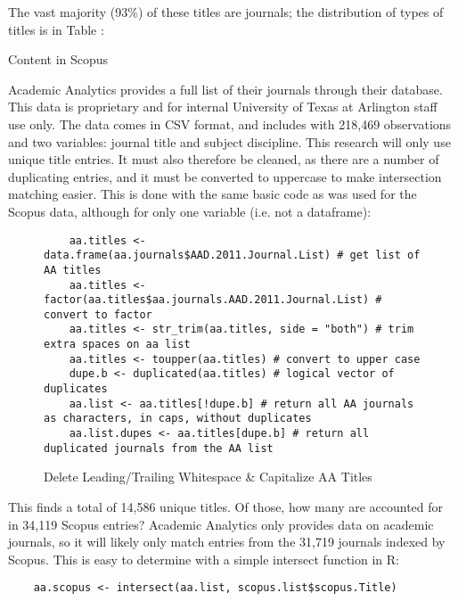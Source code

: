\documentclass{article}
\begin{document}
The vast majority (93\%) of these titles are journals; the distribution of types of titles is in Table :
\begin{table}
	\centering
	\caption{Content in Scopus}
\end{table}
Academic Analytics provides a full list of their journals through their database. 
This data is proprietary and for internal University of Texas at Arlington staff use only. 
The data comes in CSV format, and includes with 218,469 observations and two variables: journal title and subject discipline.
This research will only use unique title entries.
It must also therefore be cleaned, as there are a number of duplicating entries, and it must be converted to uppercase to make intersection matching easier.
This is done with the same basic code as was used for the Scopus data, although for only one variable (i.e. not a dataframe):
\begin{figure}
	\centering
	\begin{lstlisting}
	aa.titles <- data.frame(aa.journals$AAD.2011.Journal.List) # get list of AA titles
	aa.titles <- factor(aa.titles$aa.journals.AAD.2011.Journal.List) # convert to factor
	aa.titles <- str_trim(aa.titles, side = "both") # trim extra spaces on aa list
	aa.titles <- toupper(aa.titles) # convert to upper case
	dupe.b <- duplicated(aa.titles) # logical vector of duplicates
	aa.list <- aa.titles[!dupe.b] # return all AA journals as characters, in caps, without duplicates
	aa.list.dupes <- aa.titles[dupe.b] # return all duplicated journals from the AA list
	\end{lstlisting}
	\caption{Delete Leading/Trailing Whitespace \& Capitalize AA Titles}
\end{figure}

This finds a total of 14,586 unique titles.
Of those, how many are accounted for in 34,119 Scopus entries?
Academic Analytics only provides data on academic journals, so it will likely only match entries from the 31,719 journals indexed by Scopus.
This is easy to determine with a simple intersect function in R:
\begin{lstlisting}
	aa.scopus <- intersect(aa.list, scopus.list$scopus.Title)
\end{lstlisting}
\end{document}
